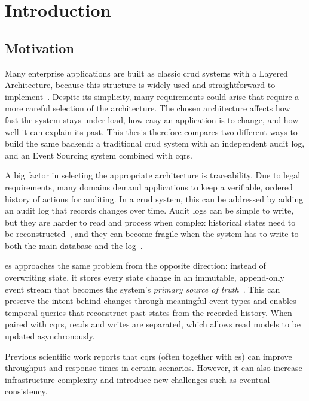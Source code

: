\chapter{Introduction}
\label{ch:introduction}

\section{Motivation}
\label{sec:motivation}

Many enterprise applications are built as classic \acrshort{crud} systems with a Layered Architecture, because this structure is widely used and straightforward to implement~\cite[Chapter 1]{richards_software_2015}. Despite its simplicity, many requirements could arise that require a more careful selection of the architecture. The chosen architecture affects how fast the system stays under load, how easy an application is to change, and how well it can explain its past. This thesis therefore compares two different ways to build the same backend: a traditional \acrshort{crud} system with an independent audit log, and an Event Sourcing system combined with \acrshort{cqrs}.

A big factor in selecting the appropriate architecture is traceability. Due to legal requirements, many domains demand applications to keep a verifiable, ordered history of actions for auditing. In a \acrshort{crud} system, this can be addressed by adding an audit log that records changes over time. Audit logs can be simple to write, but they are harder to read and process when complex historical states need to be reconstructed~\cite{fowler_audit_2004}, and they can become fragile when the system has to write to both the main database and the log~\cite[452,453]{kleppmann_designing_2017}.

\acrlong{es} approaches the same problem from the opposite direction: instead of overwriting state, it stores every state change in an immutable, append-only event stream that becomes the system's \emph{primary source of truth}~\cite{helland_immutability_2015}. This can preserve the intent behind changes through meaningful event types and enables temporal queries that reconstruct past states from the recorded history. When paired with \acrshort{cqrs}, reads and writes are separated, which allows read models to be updated asynchronously.

Previous scientific work reports that \acrshort{cqrs} (often together with \acrlong{es}) can improve throughput and response times in certain scenarios. However, it can also increase infrastructure complexity and introduce new challenges such as eventual consistency.

